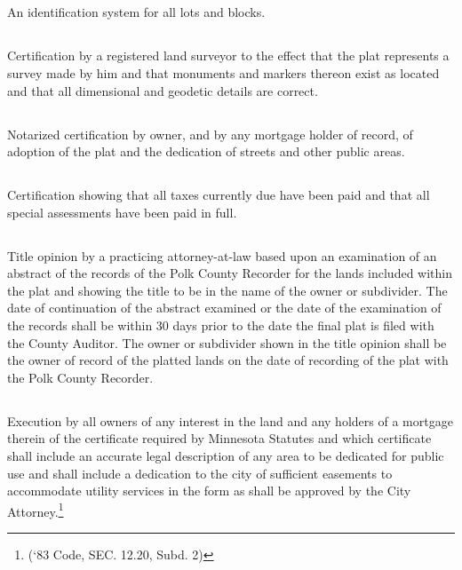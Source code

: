 \subsection{}
An identification system for all lots and blocks.
\subsection{}
Certification by a registered land surveyor to the effect that the plat represents a survey made by him and that monuments and markers thereon exist as located and that all dimensional and geodetic details are correct.
\subsection{}
Notarized certification by owner, and by any mortgage holder of record, of adoption of the plat and the dedication of streets and other public areas.
\subsection{}
Certification showing that all taxes currently due have been paid and that all special assessments have been paid in full.
\subsection{}
Title opinion by a practicing attorney-at-law based upon an examination of an abstract of the records of the Polk County Recorder for the lands included within the plat and showing the title to be in the name of the owner or subdivider. The date of continuation of the abstract examined or the date of the examination of the records shall be within 30 days prior to the date the final plat is filed with the County Auditor. The owner or subdivider shown in the title opinion shall be the owner of record of the platted lands on the date of recording of the plat with the Polk County Recorder.
\subsection{}
Execution by all owners of any interest in the land and any holders of a mortgage therein of the certificate required by Minnesota Statutes and which certificate shall include an accurate legal description of any area to be dedicated for public use and shall include a dedication to the city of sufficient easements to accommodate utility services in the form as shall be approved by the City Attorney.\footnote{(‘83 Code, SEC. 12.20, Subd. 2)}

